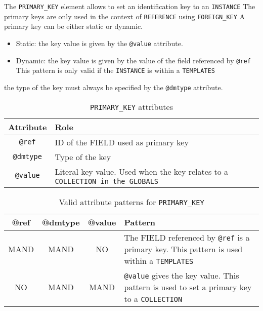 The \texttt{PRIMARY\_KEY} element allows to set an identification key to an \texttt{INSTANCE}  The primary keys are only used in the context of \texttt{REFERENCE}  using \texttt{FOREIGN\_KEY} 
A primary key can be either static or dynamic.

\begin{itemize}
    \item Static: the key value is given by the \texttt{@value} attribute.
    \item Dynamic: the key value is given by the value of the field referenced by \texttt{@ref}  
    This pattern is only valid if the \texttt{INSTANCE} is within a \texttt{TEMPLATES}  
\end{itemize}

the type of the key must always be specified by the \texttt{@dmtype} attribute. 

\begin{table}[!htbp]
\small
\centering
\begin{tabulary}{\linewidth}{|c|J|}       
       \hline 
            \textbf{Attribute} & 
            \textbf {Role}\\
       \hline         \hline  
            \texttt{@ref} &
            ID of the FIELD used as primary key \\
        \hline 
            \texttt{@dmtype} & 
            Type of the key \\
        \hline 
            \texttt{@value} & 
            Literal key value. Used when the key relates to a \texttt{COLLECTION in the \texttt{GLOBALS}} \\
        \hline 
     \end{tabulary}
     \caption{\texttt{PRIMARY\_KEY} attributes} 
     \label{tbl:primarykey-att}
 \end{table}

\begin{table}[!htbp]
\small
\centering
\begin{tabulary}{\linewidth}{|c|c|c|J|}
    \hline 
        \textbf{@ref} &
        \textbf{@dmtype} &
        \textbf{@value} &
        \textbf{Pattern}\\
    \hline      \hline  
        MAND &           
        MAND &           
        NO &           
        The FIELD referenced by \texttt{@ref} is a primary key. This pattern is used within a \texttt{TEMPLATES} \\
    \hline     
        NO &           
        MAND &           
        MAND &           
        \texttt{@value} gives the key value. This pattern is used to set a primary key to a \texttt{COLLECTION}\\
   \hline 
\end{tabulary}
     \caption{Valid attribute patterns for  \texttt{PRIMARY\_KEY}}
     \label{tbl:primarykey-pattern}
\end{table}

